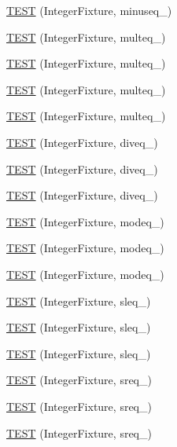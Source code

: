 \begin{DoxyCompactItemize}
\hyperlink{TestInteger_8c_09_09_a05fdbf6bfcdec7074489fd9112ebce85}{T\-E\-S\-T} (Integer\-Fixture, minuseq\-\_)
\item 
\hyperlink{TestInteger_8c_09_09_ab797996dbd77bbeb3883de3ae9352215}{T\-E\-S\-T} (Integer\-Fixture, multeq\-\_)
\item 
\hyperlink{TestInteger_8c_09_09_aaec7a8c5b5d5d3f506b2e20dc53ce05e}{T\-E\-S\-T} (Integer\-Fixture, multeq\-\_)
\item 
\hyperlink{TestInteger_8c_09_09_ac8de447f23e241d050b20360abc7cf50}{T\-E\-S\-T} (Integer\-Fixture, multeq\-\_)
\item 
\hyperlink{TestInteger_8c_09_09_a61af0983b3080ac7d057f52046451bac}{T\-E\-S\-T} (Integer\-Fixture, multeq\-\_)
\item 
\hyperlink{TestInteger_8c_09_09_a7cbb51b7a0ff179cf394cd2896fb622f}{T\-E\-S\-T} (Integer\-Fixture, diveq\-\_)
\item 
\hyperlink{TestInteger_8c_09_09_a4d4f38163ebfefe14e83ec1ed18bb238}{T\-E\-S\-T} (Integer\-Fixture, diveq\-\_)
\item 
\hyperlink{TestInteger_8c_09_09_a553313669ed235bced7659d9fde90295}{T\-E\-S\-T} (Integer\-Fixture, diveq\-\_)
\item 
\hyperlink{TestInteger_8c_09_09_a5066e6742dbdc5eacdb820f0964a4533}{T\-E\-S\-T} (Integer\-Fixture, modeq\-\_)
\item 
\hyperlink{TestInteger_8c_09_09_aa7cccd88c4ccb4bcd770aedd21d9c74f}{T\-E\-S\-T} (Integer\-Fixture, modeq\-\_)
\item 
\hyperlink{TestInteger_8c_09_09_a411b790103257c77729613127fc8b8b4}{T\-E\-S\-T} (Integer\-Fixture, modeq\-\_)
\item 
\hyperlink{TestInteger_8c_09_09_a03266ab5bdfac3580e382a72cdef3a9e}{T\-E\-S\-T} (Integer\-Fixture, sleq\-\_)
\item 
\hyperlink{TestInteger_8c_09_09_a19c58ea53e09b27130c71132a9c17e4b}{T\-E\-S\-T} (Integer\-Fixture, sleq\-\_)
\item 
\hyperlink{TestInteger_8c_09_09_a74e91182d918dfae7d839ff30acd5770}{T\-E\-S\-T} (Integer\-Fixture, sleq\-\_)
\item 
\hyperlink{TestInteger_8c_09_09_ae48927e927f71ad1b9c5ac37f6610b63}{T\-E\-S\-T} (Integer\-Fixture, sreq\-\_)
\item 
\hyperlink{TestInteger_8c_09_09_a2d8a8775827539f8a6c7519764782a10}{T\-E\-S\-T} (Integer\-Fixture, sreq\-\_)
\item 
\hyperlink{TestInteger_8c_09_09_a62d37ea779f02b8d4d39331a1baee704}{T\-E\-S\-T} (Integer\-Fixture, sreq\-\_)

\end{DoxyCompactItemize}
